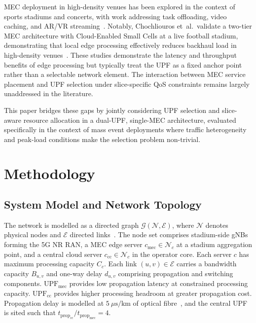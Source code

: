 \documentclass[conference]{IEEEtran}
\begin{document}
MEC deployment in high-density venues has been explored in the
context of sports stadiums and concerts, with work addressing task
offloading, video caching, and AR/VR
streaming~\cite{mehrabi2019device}. Notably, Chochliouros
et~al.\ validate a two-tier MEC architecture with
Cloud-Enabled Small Cells at a live football stadium,
demonstrating that local edge processing effectively reduces
backhaul load in high-density
venues~\cite{Chochliouros2020stadium, Kostopoulos2019edge}. These
studies demonstrate the latency and throughput benefits of edge
processing but typically treat the UPF as a fixed anchor point
rather than a selectable network element. The interaction between
MEC service placement and UPF selection under slice-specific QoS
constraints remains largely unaddressed in the literature.

This paper bridges these gaps by jointly considering UPF selection
and slice-aware resource allocation in a dual-UPF, single-MEC
architecture, evaluated specifically in the context of mass event
deployments where traffic heterogeneity and peak-load conditions
make the selection problem non-trivial.

\section{Methodology}
\label{sec:methodology}

\subsection{System Model and Network Topology}

The network is modelled as a directed graph $\mathcal{G}
(\mathcal{N},\mathcal{E})$, where $\mathcal{N}$ denotes
physical nodes and $\mathcal{E}$ directed
links~\cite{LeyvaUPC2023}. The node set comprises
stadium-side gNBs forming the 5G NR RAN, a MEC edge server
$c_\text{mec} \in \mathcal{N}_c$ at a stadium aggregation
point, and a central cloud server $c_\text{cc} \in
\mathcal{N}_c$ in the operator core. Each server $c$ has
maximum processing capacity $C_c$. Each link $(u,v) \in
\mathcal{E}$ carries a bandwidth capacity $B_{u,v}$
and one-way delay $d_{u,v}$ comprising propagation and
switching components.
$\text{UPF}_\text{mec}$ provides low propagation latency
at constrained processing capacity.
$\text{UPF}_\text{cc}$ provides higher processing headroom
at greater propagation cost. Propagation delay is modelled
at $5~\mu\text{s/km}$ of optical fibre~\cite{Alevizaki2021upf},
and the central UPF is sited such that
$t_{\text{prop}_\text{cc}} / t_{\text{prop}_\text{mec}} = 4$.
\end{document}
